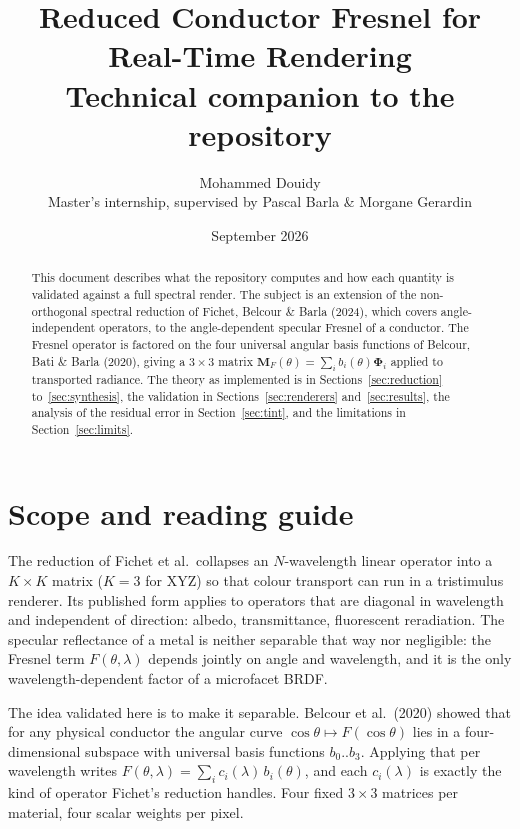 \documentclass[11pt,a4paper]{article}
\title{Reduced Conductor Fresnel for Real-Time Rendering\\
       \large Technical companion to the \file{fresnel-reduction-validation} repository}
\author{Mohammed Douidy\\ \small Master's internship, supervised by Pascal Barla \& Morgane Gerardin}
\date{September 2026}
\newcommand{\mPhi}{\boldsymbol{\Phi}}
\newcommand{\mM}{\mathbf{M}}
\newcommand{\lam}{\lambda}
\begin{document}
\maketitle

\begin{abstract}
\noindent
This document describes what the repository computes and how each quantity is
validated against a full spectral render.  The subject is an extension of the
non-orthogonal spectral reduction of Fichet, Belcour \& Barla (2024), which
covers angle-independent operators, to the angle-dependent specular Fresnel of
a conductor.  The Fresnel operator is factored on the four universal angular
basis functions of Belcour, Bati \& Barla (2020), giving a $3\times3$ matrix
$\mM_F(\theta)=\sum_i b_i(\theta)\mPhi_i$ applied to transported radiance.
The theory as implemented is in Sections~\ref{sec:reduction}
to~\ref{sec:synthesis}, the validation in Sections~\ref{sec:renderers}
and~\ref{sec:results}, the analysis of the residual error in
Section~\ref{sec:tint}, and the limitations in Section~\ref{sec:limits}.
\end{abstract}

\tableofcontents

\section{Scope and reading guide}
\label{sec:scope}

The reduction of Fichet et al.\ collapses an $N$-wavelength linear operator
into a $K\times K$ matrix ($K=3$ for XYZ) so that colour transport can run in a
tristimulus renderer.  Its published form applies to operators that are
diagonal in wavelength and independent of direction: albedo, transmittance,
fluorescent reradiation.  The specular reflectance of a metal is neither
separable that way nor negligible: the Fresnel term $F(\theta,\lam)$ depends
jointly on angle and wavelength, and it is the only wavelength-dependent factor
of a microfacet BRDF.

The idea validated here is to make it separable.  Belcour et al.\ (2020) showed
that for any physical conductor the angular curve $\cos\theta\mapsto
F(\cos\theta)$ lies in a four-dimensional subspace with universal basis
functions $b_0..b_3$.  Applying that per wavelength writes
$F(\theta,\lam)=\sum_i c_i(\lam)\,b_i(\theta)$, and each $c_i(\lam)$ is exactly
the kind of operator Fichet's reduction handles.  Four fixed $3\times3$
matrices per material, four scalar weights per pixel.
\end{document}
